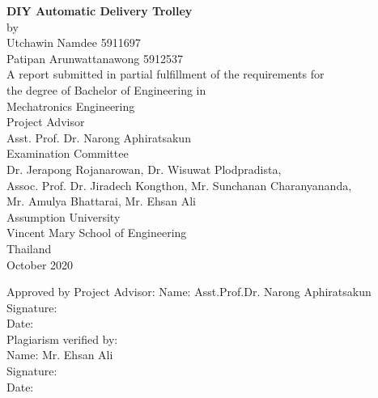 \documentclass[12pt]{article}
\begin{document}
\begin{titlepage}
	\begin{center}
		
		\LARGE{\bfseries DIY Automatic Delivery Trolley} \\
		[1cm]
		\normalsize by \\
		[1cm]
		Utchawin Namdee 5911697 \\
		Patipan Arunwattanawong 5912537 \\
		[1cm]
		A report submitted in partial fulfillment of the requirements for \\
		the degree of Bachelor of Engineering in \\
		Mechatronics Engineering \\
		[1cm]
		Project Advisor\\
		Asst. Prof. Dr. Narong Aphiratsakun \\
		[1cm]
		Examination Committee \\
		[1cm]
		Dr. Jerapong Rojanarowan, Dr. Wisuwat Plodpradista, \\
		Assoc. Prof. Dr. Jiradech Kongthon, Mr. Sunchanan Charanyananda, \\
		Mr. Amulya Bhattarai, Mr. Ehsan Ali \\
		[1cm]
		Assumption University \\
		Vincent Mary School of Engineering\\
		Thailand \\
		October 2020 \\
		
	\end{center}
\end{titlepage}

\newpage

Approved by Project Advisor:\newline
\hspace*{7cm} Name: Asst.Prof.Dr. Narong Aphiratsakun \\
\hspace*{7cm} Signature:\\
\hspace*{7cm} Date:\hrulefill \\
Plagiarism verified by: \\
\hspace*{7cm} Name: Mr. Ehsan Ali \\
\hspace*{7cm} Signature: \\
\hspace*{7cm} Date:\hrulefill \\
\end{document}

